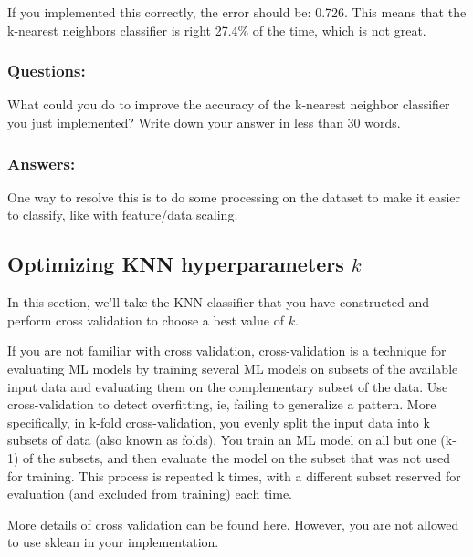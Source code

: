 \documentclass[11pt]{article}
\begin{document}
    If you implemented this correctly, the error should be: 0.726. This
means that the k-nearest neighbors classifier is right 27.4\% of the
time, which is not great.

    \hypertarget{questions}{%
\subsubsection{Questions:}\label{questions}}

What could you do to improve the accuracy of the k-nearest neighbor
classifier you just implemented? Write down your answer in less than 30
words.

    \hypertarget{answers}{%
\subsubsection{Answers:}\label{answers}}

One way to resolve this is to do some processing on the dataset to make
it easier to classify, like with feature/data scaling.

    \hypertarget{optimizing-knn-hyperparameters-k}{%
\subsection{\texorpdfstring{Optimizing KNN hyperparameters
\(k\)}{Optimizing KNN hyperparameters k}}\label{optimizing-knn-hyperparameters-k}}

In this section, we'll take the KNN classifier that you have constructed
and perform cross validation to choose a best value of \(k\).

If you are not familiar with cross validation, cross-validation is a
technique for evaluating ML models by training several ML models on
subsets of the available input data and evaluating them on the
complementary subset of the data. Use cross-validation to detect
overfitting, ie, failing to generalize a pattern. More specifically, in
k-fold cross-validation, you evenly split the input data into k subsets
of data (also known as folds). You train an ML model on all but one
(k-1) of the subsets, and then evaluate the model on the subset that was
not used for training. This process is repeated k times, with a
different subset reserved for evaluation (and excluded from training)
each time.

More details of cross validation can be found
\href{https://scikit-learn.org/stable/modules/cross_validation.html}{here}.
However, you are not allowed to use sklean in your implementation.
\end{document}
